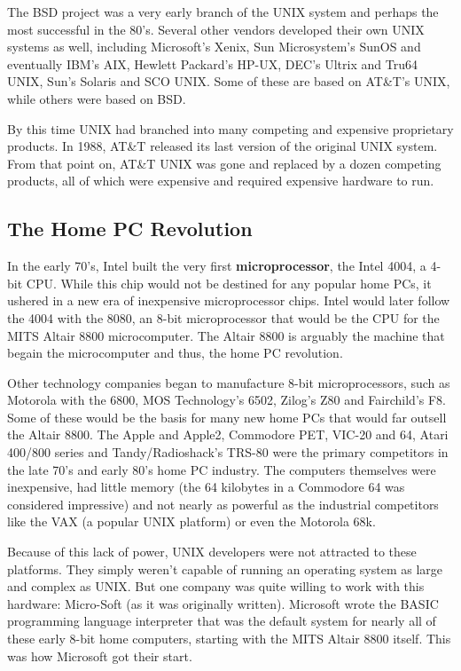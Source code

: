 The BSD project was a very early branch of the UNIX system and perhaps the most successful in the 80's. Several other vendors developed their own UNIX systems as well, including Microsoft's Xenix, Sun Microsystem's SunOS and eventually IBM's AIX, Hewlett Packard's HP-UX, DEC's Ultrix and Tru64 UNIX, Sun's Solaris and SCO UNIX. Some of these are based on AT\&T's UNIX, while others were based on BSD.

By this time UNIX had branched into many competing and expensive proprietary products. In 1988, AT\&T released its last version of the original UNIX system. From that point on, AT\&T UNIX was gone and replaced by a dozen competing products, all of which were expensive and required expensive hardware to run.

\subsection{The Home PC Revolution}

In the early 70's, Intel built the very first \textbf{microprocessor}, the Intel 4004, a 4-bit CPU.  While this chip would not be destined for any popular home PCs, it ushered in a new era of inexpensive microprocessor chips.  Intel would later follow the 4004 with the 8080, an 8-bit microprocessor that would be the CPU for the MITS Altair 8800 microcomputer.  The Altair 8800 is arguably the machine that begain the microcomputer and thus, the home PC revolution.

Other technology companies began to manufacture 8-bit microprocessors, such as Motorola with the 6800, MOS Technology's 6502, Zilog's Z80 and Fairchild's F8.  Some of these would be the basis for many new home PCs that would far outsell the Altair 8800.  The Apple and Apple2, Commodore PET, VIC-20 and 64, Atari 400/800 series and Tandy/Radioshack's TRS-80 were the primary competitors in the late 70's and early 80's home PC industry.  The computers themselves were inexpensive, had little memory (the 64 kilobytes in a Commodore 64 was considered impressive) and not nearly as powerful as the industrial competitors like the VAX (a popular UNIX platform) or even the Motorola 68k.

Because of this lack of power, UNIX developers were not attracted to these platforms.  They simply weren't capable of running an operating system as large and complex as UNIX.  But one company was quite willing to work with this hardware: Micro-Soft (as it was originally written).  Microsoft wrote the BASIC programming language interpreter that was the default system for nearly all of these early 8-bit home computers, starting with the MITS Altair 8800 itself.  This was how Microsoft got their start.


